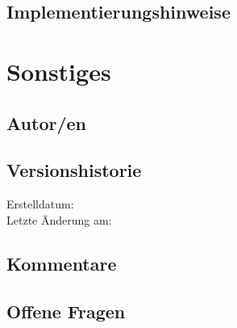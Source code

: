\subsection*{Implementierungshinweise}
\implementation


\section*{Sonstiges}

\subsection*{Autor/en}
\authors

\subsection*{Versionshistorie}
Erstelldatum: \dateofcreation \\
Letzte Änderung am: \versionhistory

\subsection*{Kommentare}
\comments

\subsection*{Offene Fragen}
\questions

\listoffigures

\printbibliography

\clearpage

\printglossaries

